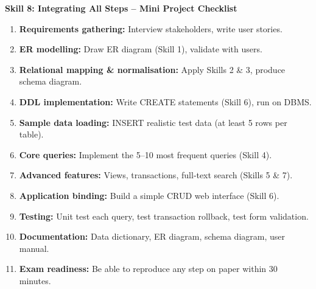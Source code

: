 \documentclass[11pt]{article}
\begin{document}
\textbf{Skill 8: Integrating All Steps – Mini Project Checklist}\par
\begin{methode}
\begin{enumerate}
\item \textbf{Requirements gathering:} Interview stakeholders, write user stories.
\item \textbf{ER modelling:} Draw ER diagram (Skill 1), validate with users.
\item \textbf{Relational mapping \& normalisation:} Apply Skills 2 \& 3, produce schema diagram.
\item \textbf{DDL implementation:} Write CREATE statements (Skill 6), run on DBMS.
\item \textbf{Sample data loading:} INSERT realistic test data (at least 5 rows per table).
\item \textbf{Core queries:} Implement the 5–10 most frequent queries (Skill 4).
\item \textbf{Advanced features:} Views, transactions, full‑text search (Skills 5 \& 7).
\item \textbf{Application binding:} Build a simple CRUD web interface (Skill 6).
\item \textbf{Testing:} Unit test each query, test transaction rollback, test form validation.
\item \textbf{Documentation:} Data dictionary, ER diagram, schema diagram, user manual.
\item \textbf{Exam readiness:} Be able to reproduce any step on paper within 30 minutes.
\end{enumerate}
\end{methode}
\end{document}
